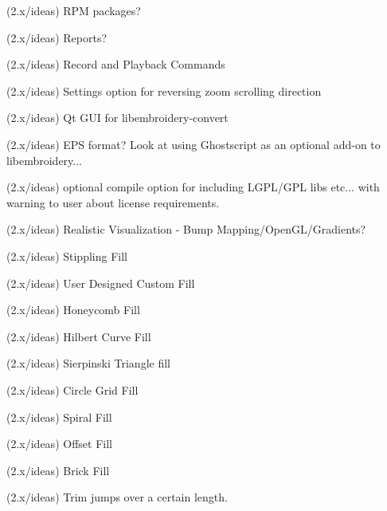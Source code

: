 \begin{DoxyRefList}
\label{todo__todo000328}%
%
(2.\+x/ideas) RPM packages?

\label{todo__todo000329}%
%
(2.\+x/ideas) Reports?

\label{todo__todo000330}%
%
(2.\+x/ideas) Record and Playback Commands

\label{todo__todo000331}%
%
(2.\+x/ideas) Settings option for reversing zoom scrolling direction

\label{todo__todo000332}%
%
(2.\+x/ideas) Qt GUI for libembroidery-\/convert

\label{todo__todo000333}%
%
(2.\+x/ideas) EPS format? Look at using Ghostscript as an optional add-\/on to libembroidery...

\label{todo__todo000334}%
%
(2.\+x/ideas) optional compile option for including LGPL/\+GPL libs etc... with warning to user about license requirements.

\label{todo__todo000335}%
%
(2.\+x/ideas) Realistic Visualization -\/ Bump Mapping/\+Open\+GL/\+Gradients?

\label{todo__todo000336}%
%
(2.\+x/ideas) Stippling Fill

\label{todo__todo000337}%
%
(2.\+x/ideas) User Designed Custom Fill

\label{todo__todo000338}%
%
(2.\+x/ideas) Honeycomb Fill

\label{todo__todo000339}%
%
(2.\+x/ideas) Hilbert Curve Fill

\label{todo__todo000340}%
%
(2.\+x/ideas) Sierpinski Triangle fill

\label{todo__todo000341}%
%
(2.\+x/ideas) Circle Grid Fill

\label{todo__todo000342}%
%
(2.\+x/ideas) Spiral Fill

\label{todo__todo000343}%
%
(2.\+x/ideas) Offset Fill

\label{todo__todo000344}%
%
(2.\+x/ideas) Brick Fill

\label{todo__todo000345}%
%
(2.\+x/ideas) Trim jumps over a certain length.


\end{DoxyRefList}
